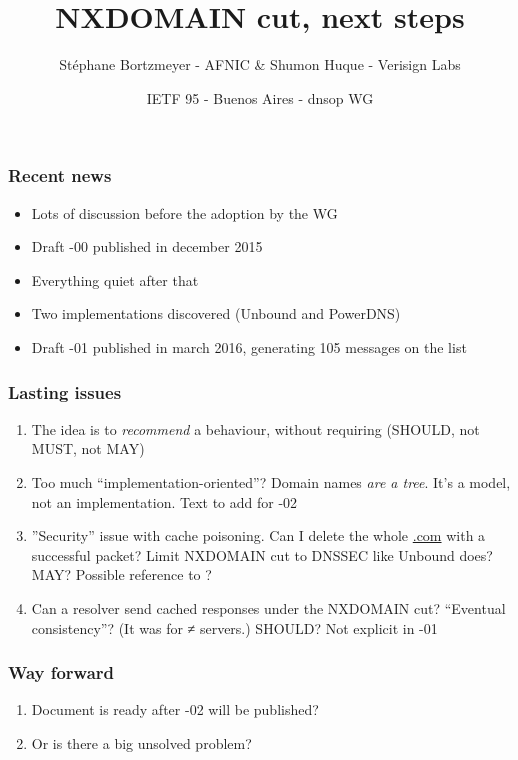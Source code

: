 \documentclass[ignorenonframetext]{beamer}
\title{NXDOMAIN cut, next steps}
\author{Stéphane Bortzmeyer - AFNIC \& Shumon Huque - Verisign Labs}
\date{IETF 95 - Buenos Aires - dnsop WG}
\begin{document}
\begin{frame}
\maketitle  
\end{frame}

\begin{frame}
  \frametitle{Recent news}
  \begin{itemize}
  \item<2->Lots of discussion before the adoption by the WG
  \item<3->Draft -00 published in december 2015
  \item<4->Everything quiet after that
  \item<5->Two implementations discovered (Unbound and PowerDNS)
  \item<6->Draft -01 published in march 2016, generating 105 messages
    on the list
  \end{itemize}
\end{frame}

\begin{frame}
  \frametitle{Lasting issues}
  \begin{enumerate}
  \item<1->The idea is to \emph{recommend} a behaviour, without
    requiring (SHOULD, not MUST, not MAY)
  \item<2->Too much ``implementation-oriented''? Domain names
    \emph{are a tree}. It's a model, not an implementation. Text to
    add for -02
  \item<3->''Security'' issue with cache poisoning. Can I delete
    the whole \url{.com} with a successful packet? Limit NXDOMAIN cut to
    DNSSEC like Unbound does? MAY? Possible reference to ?
   \item<4->Can a resolver send cached responses under the NXDOMAIN
     cut? ``Eventual consistency''? (It was for ≠ servers.) SHOULD?
     Not explicit in -01
  \end{enumerate}
\end{frame}

\begin{frame}
  \frametitle{Way forward}
  \begin{enumerate}
  \item<2->Document is ready after -02 will be published?
  \item<3->Or is there a big unsolved problem?
  \end{enumerate}
\end{frame}
\end{document}
